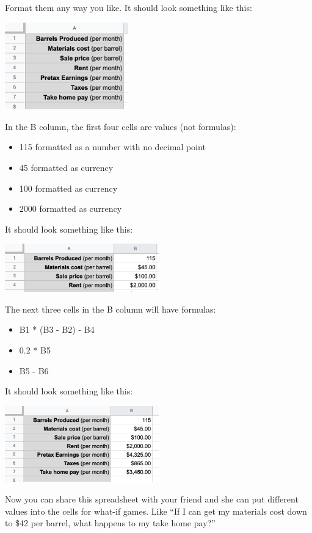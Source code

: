 Format them any way you like. It should look something like this:

\includegraphics[width=0.4\textwidth]{BarrelLabels.png}

In the B column, the first four cells are values (not formulas):
\begin{itemize}
\item{115 formatted as a number with no decimal point}
\item{45 formatted as currency}
\item{100 formatted as currency}
\item{2000 formatted as currency}
\end{itemize}

It should look something like this:

\includegraphics[width=0.5\textwidth]{BarrelValues.png}

The next three cells in the B column will have formulas:
\begin{itemize}
\item{B1 * (B3 - B2) - B4}
\item{0.2 * B5}
\item{B5 - B6}
\end{itemize}

It should look something like this:

\includegraphics[width=0.5\textwidth]{BarrelFormulas.png}

Now you can share this spreadsheet with your friend and she can put
different values into the cells for what-if games.  Like ``If I can
get my materials cost down to \$42 per barrel, what happens to my take
home pay?''

